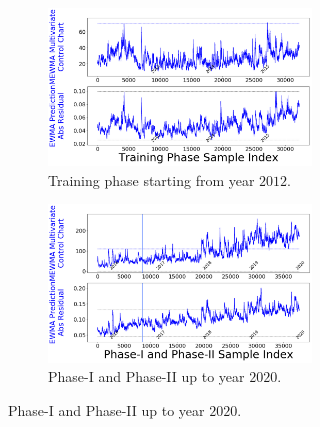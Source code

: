 \documentclass[twoside,11pt]{article}
\begin{document}
\begin{figure}[!htbp]
\centering
\begin{subfigure}[t]{0.48\linewidth}
     \centering
     \begin{subfigure}[t]{\linewidth}
     \centering
         \includegraphics[width=\textwidth, trim=.0in .0in .0in .0in, clip]{../figures/v14/bike_sharing/reg_lin_cat_syr_12_tr_5/train_bike_reg_1e-08_0_0001_0_01_99_99.png}
         \caption{Training phase starting from year $2012$.}
     \end{subfigure}
     \begin{subfigure}[t]{\linewidth}
     \centering
         \includegraphics[width=\textwidth, trim=.0in .0in .0in .0in, clip]{../figures/v14/bike_sharing/reg_lin_cat_syr_12_tr_5/bike_reg_1e-08_0_0001_0_01_99_99.png}
         \caption{Phase-I and Phase-II up to year $2020$.}
     \end{subfigure}
     \label{fig:bs_tr_2012}
\end{subfigure}
\begin{subfigure}[t]{0.48\linewidth}

\end{subfigure}
\end{figure}
\end{document}
